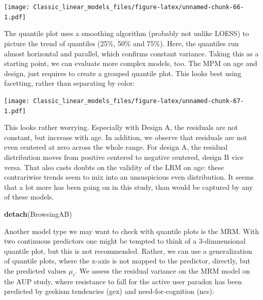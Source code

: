 \documentclass[]{svmono}
\newenvironment{Shaded}{\begin{snugshade}}{\end{snugshade}}
\newcommand{\KeywordTok}[1]{\textcolor[rgb]{0.13,0.29,0.53}{\textbf{#1}}}
\newcommand{\DataTypeTok}[1]{\textcolor[rgb]{0.13,0.29,0.53}{#1}}
\newcommand{\DecValTok}[1]{\textcolor[rgb]{0.00,0.00,0.81}{#1}}
\newcommand{\StringTok}[1]{\textcolor[rgb]{0.31,0.60,0.02}{#1}}
\newcommand{\OperatorTok}[1]{\textcolor[rgb]{0.81,0.36,0.00}{\textbf{#1}}}
\newcommand{\NormalTok}[1]{#1}
\theoremstyle{definition}
\theoremstyle{definition}
\theoremstyle{definition}
\theoremstyle{remark}
\begin{document}
\texttt{[image: Classic\_linear\_models\_files/figure-latex/unnamed-chunk-66-1.pdf]}

The quantile plot uses a smoothing algorithm (probably not unlike LOESS)
to picture the trend of quantiles (25\%, 50\% and 75\%). Here, the
quantiles run almost horizontal and parallel, which confirms constant
variance. Taking this as a starting point, we can evaluate more complex
models, too. The MPM on age and design, just requires to create a
grouped quantile plot. This looks best using facetting, rather than
separating by color:

\begin{Shaded}
\end{Shaded}

\texttt{[image: Classic\_linear\_models\_files/figure-latex/unnamed-chunk-67-1.pdf]}

This looks rather worrying. Especially with Design A, the residuals are
not constant, but increase with age. In addition, we observe that
residuals are not even centered at zero across the whole range. For
design A, the residual distribution moves from positive centered to
negative centered, design B vice versa. That also casts doubts on the
validity of the LRM on age: these contrariwise trends seem to mix into
an unsuspicious even distribution. It seems that a lot more has been
going on in this study, than would be captured by any of these models.

\begin{Shaded}
\begin{Highlighting}[]
\KeywordTok{detach}\NormalTok{(BrowsingAB)}
\end{Highlighting}
\end{Shaded}

Another model type we may want to check with quantile plots is the MRM.
With two continuous predictors one might be tempted to think of a
3-dimnensional quantile plot, but this is not recommended. Rather, we
can use a generalization of quantile plots, where the x-axis is not
mapped to the predictor, directly, but the predicted values \(\mu_i\).
We assess the residual variance on the MRM model on the AUP study, where
resistance to fall for the active user paradox has been predicted by
geekism tendencies (gex) and need-for-cognition (ncs):
\end{document}
